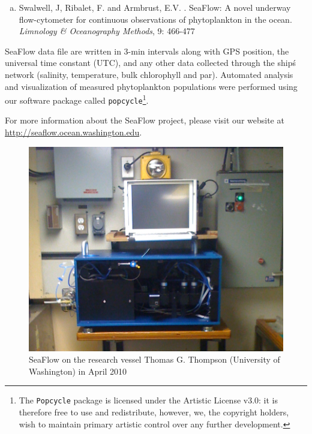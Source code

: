 \documentclass[a4paper]{article}
\begin{document}
\begin{enumerate}[(a)]
\item{
Swalwell, J, Ribalet, F. and Armbrust, E.V.
. SeaFlow: A novel underway flow-cytometer for continuous observations of phytoplankton in the ocean. \newblock \emph{Limnology \& Oceanography Methods}, 9: 466-477
}
\end{enumerate}

SeaFlow data file are written in 3-min intervals along with GPS position, the universal time constant (UTC), and any other data collected through the ship\'s network (salinity, temperature, bulk chlorophyll and par). Automated analysis and visualization of measured phytoplankton populations were performed using our software package called \texttt{popcycle}\footnote{The \texttt{Popcycle} package is licensed under the Artistic License v3.0: it is therefore free to use and redistribute, however, we, the copyright holders, wish to maintain primary artistic control over any further development.}.

For more information about the SeaFlow project, please visit our website at \url{http://seaflow.ocean.washington.edu}. 


\vspace{15 mm}
\begin{figure}[h]
\centering
\begin{minipage}{0.5\linewidth}
\includegraphics[width=1\textwidth]{seaflow2.png}
\caption{SeaFlow on the research vessel Thomas G. Thompson (University of Washington) in April 2010}
\end{minipage}
\end{figure}		
\end{document}
